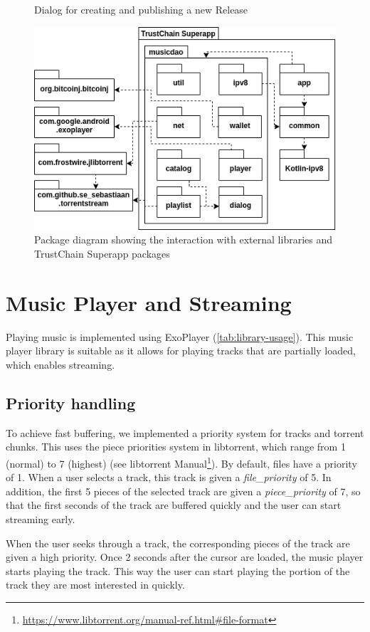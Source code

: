 \begin{figure}
        \caption{Dialog for creating and publishing a new Release}
        \label{fig:submit-release-dialog}
    \endminipage\hfill
    \includegraphics[width=1\linewidth]{implementation/package-diagram.png}
        \caption{Package diagram showing the interaction with external libraries and TrustChain Superapp packages}
    \label{fig:package-diagram}
    \endminipage
\end{figure}

\section{Music Player and Streaming} 
Playing music is implemented using ExoPlayer (\ref{tab:library-usage}). This music player library is suitable as it allows for playing tracks that are partially loaded, which enables streaming.
\subsection{Priority handling}
To achieve fast buffering, we implemented a priority system for tracks and torrent chunks. This uses the piece priorities system in libtorrent, which range from 1 (normal) to 7 (highest) (see libtorrent Manual\footnote{\url{https://www.libtorrent.org/manual-ref.html\#file-format}}). By default, files have a priority of 1. When a user selects a track, this track is given a \textit{file\_priority} of 5. In addition, the first 5  pieces of the selected track are given a \textit{piece\_priority} of 7, so that the first seconds of the track are buffered quickly and the user can start streaming early.

When the user seeks through a track, the corresponding pieces of the track are given a high priority. Once 2 seconds after the cursor are loaded, the music player starts playing the track. This way the user can start playing the portion of the track they are most interested in quickly.

